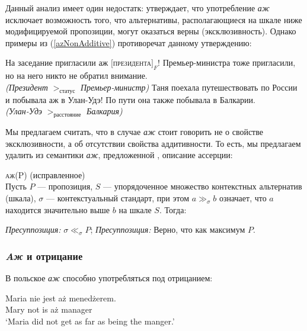 \documentclass[a4paper, titlepage]{article}
\begin{document}
Данный анализ имеет один недостатк: \citep{tomaszevicz2011az} утверждает, что употребление \textit{аж} исключает возможность того, что альтернативы, располагающиеся на шкале ниже модифицируемой пропозиции, могут оказаться верны (эксклюзивность). Однако примеры из (\ref{azNonAdditive}) противоречат данному утверждению:

 \begin{exe}
    \ex \label{azNonAdditive} \begin{xlist}
        \ex На заседание пригласили аж $ [ $\textsc{президента}$ ]_F $! Премьер-министра тоже пригласили, но на него никто не обратил внимание. \\
            \textit{(Президент} $ >_{\text{статус}} $ \textit{Премьер-министр)}
        \ex Таня поехала путешествовать по России и побывала аж в Улан-Удэ! По пути она также побывала в Балкарии. \\
        \textit{(Улан-Удэ} $ >_{\text{расстояние}} $ \textit{Балкария)}
    \end{xlist}
\end{exe}

Мы предлагаем считать, что в случае \textit{аж} стоит говорить не о свойстве эксклюзивности, а об отсутствии свойства аддитивности. То есть, мы предлагаем удалить из семантики \textit{аж}, предложенной \citep{tomaszevicz2011az}, описание ассерции:

\begin{exe}
    \ex \textsc{аж(P)} (исправленное) \\ {\footnotesize Пусть $ P $ --- пропозиция, $ S $ --- упорядоченное множество контекстных альтернатив (шкала), $ \sigma $ --- контекстуальный стандарт, при  этом $ a \gg_{\sigma} b $ означает, что $ a $ находится значительно выше $ b $ на шкале $ S $. Тогда:} \begin{xlist}
        \ex \textit{Пресуппозиция:} $ \sigma \ll_{\sigma} P $;
        \ex \label{tomaszAzPresupMax} \textit{Пресуппозиция:} Верно, что как максимум $ P $.
    \end{xlist}
\end{exe}

\subsubsection{\textit{Aж} и отрицание}

В \citep{tomaszevicz2011az} польское \textit{аж} способно употребляться под отрицанием:

\begin{exe}
    \ex \gll Maria nie jest aż menedżerem. \\
             Mary not is aż manager \\
        \glt `Maria did not get as far as being the manger.'
\end{exe}
\end{document}
